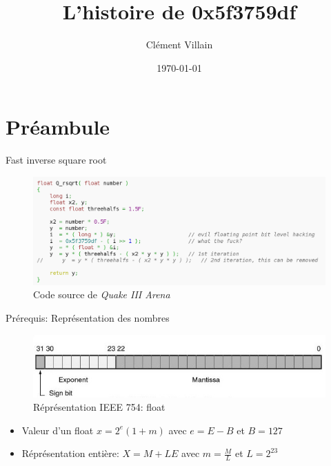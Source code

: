 \documentclass{beamer}
\institute{E.I.S.T.I.}
\title{L'histoire de 0x5f3759df}
\author{Clément Villain}
\date{\today}
\begin{document}
\begin{frame}[t,plain]
\titlepage
\end{frame}

\section{Préambule}

\begin{frame}{Fast inverse square root}
\begin{figure}
\centering
\includegraphics[scale=0.23]{img/code.png}
\caption{Code source de \textit{Quake III Arena}}
\end{figure}
\end{frame}

\begin{frame}{Prérequis: Représentation des nombres}
\begin{figure}
\centering
\includegraphics[scale=0.5]{img/i3e.jpg}
\caption{Réprésentation IEEE 754: float}
\end{figure}

\begin{itemize}
\item Valeur d'un float $x = 2^e(1 + m)$ avec $e = E - B$ et $B = 127$
\item Réprésentation entière: $X = M + LE$ avec $m = \frac{M}{L}$ et $L = 2^{23}$
\end{itemize}
\end{frame}
\end{document}
